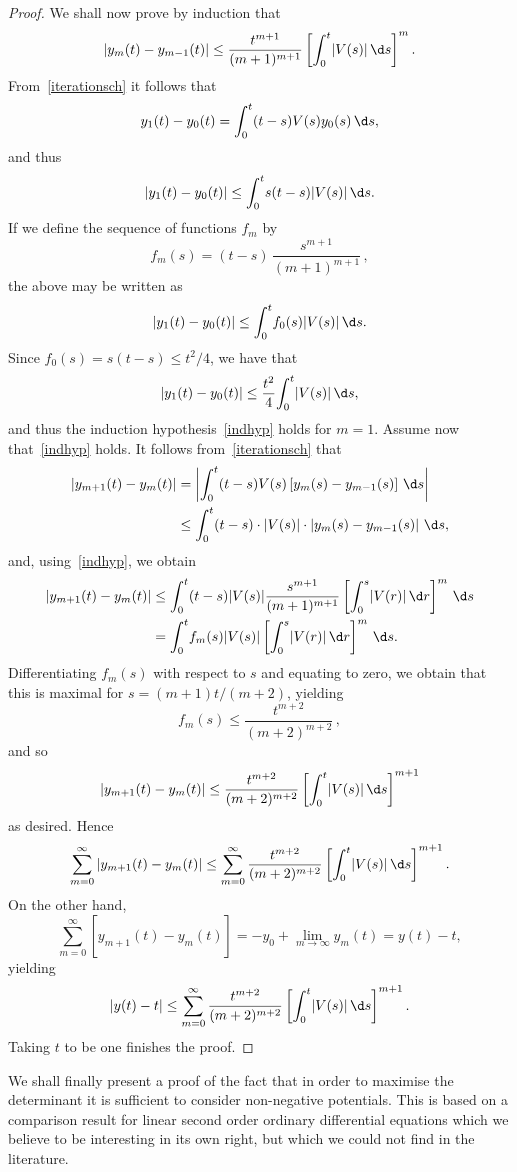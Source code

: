 \begin{proof}
We shall now prove by induction that
\begin{equation}
\label{indhyp}
|y_{m}(t)-y_{m-1}(t)|\leq \frac{ t^{m+1}}{ (m+1)^{m+1}}\left[{\int_{0}^{t}}|V(s)|\, \d s\right]^{m}.
\end{equation}
From~\eqref{iterationsch} it follows that
\[
y_{1}(t)-y_{0}(t)={\int_{0}^{t}} (t-s) V(s) y_{0}(s) \, \d s,
\]
and thus
\[
|y_{1}(t)-y_{0}(t)|\leq {\int_{0}^{t}}s (t-s) |V(s)| \, \d s.
\]
If we define the sequence of functions $f_{m}$ by
\[
f_{m}(s) = (t-s)\,\frac{ s^{m+1}}{ (m+1)^{m+1}}\,,
\]
the above may be written as
\[
|y_{1}(t)-y_{0}(t)|\leq {\int_{0}^{t}} f_{0}(s) |V(s)| \, \d s.
\]
Since $f_{0}(s) = s(t-s)\leq t^2/4$, we have that
\[
|y_{1}(t)-y_{0}(t)|\leq \frac{ t^{2}}{ 4}{\int_{0}^{t}} |V(s)| \, \d s,
\]
and thus the induction hypothesis~\eqref{indhyp} holds for $m=1$.
Assume now that~\eqref{indhyp} holds.
It follows from~\eqref{iterationsch} that
\begin{align*}
|y_{m+1}(t)-y_{m}(t)| & = \left|{\int_{0}^{t}} (t-s) V(s)\left[y_{m}(s)-y_{m-1}(s)\right]\, \d s\right|\\
& \leq {\int_{0}^{t}} (t-s)\cdot |V(s)|\cdot \left|y_{m}(s)-y_{m-1}(s)\right|\, \d s,
\end{align*}
and, using~\eqref{indhyp}, we obtain
\begin{align*}
|y_{m+1}(t)-y_{m}(t)| & \leq {\int_{0}^{t}} (t-s) |V(s)| \frac{ s^{m+1}}{ (m+1)^{m+1}}
\left[{\int_{0}^{s}}|V(r)|\, \d r\right]^{m} \, \d s\\
& = {\int_{0}^{t}} f_{m}(s)|V(s)| \left[{\int_{0}^{s}}|V(r)|\, \d r\right]^{m} \, \d s.
\end{align*}
Differentiating $f_{m}(s)$ with respect to $s$ and equating to zero, we obtain that this is maximal for $s=(m+1)t/(m+2)$, yielding
\[
f_{m}(s)\leq \frac{ t^{m+2}}{ (m+2)^{m+2}}\,,
\]
and so
\[
|y_{m+1}(t)-y_{m}(t)|\leq \frac{ t^{m+2}}{ (m+2)^{m+2}}\left[{\int_{0}^{t}}|V(s)|\, \d s\right]^{m+1}
\]
as desired. Hence
\[
\sum_{m=0}^{\infty} |y_{m+1}(t)-y_{m}(t)|\leq \sum_{m=0}^{\infty} \frac{ t^{m+2}}{ (m+2)^{m+2}}\left[{\int_{0}^{t}} |V(s)|\, \d s \right]^{m+1}.
\]
On the other hand,
\[
\sum_{m=0}^{\infty}\left[\right. y_{m+1}(t)-y_{m}(t)\left.\right]=-y_{0} + \lim_{m\to\infty} y_{m}(t) = y(t)-t,
\]
yielding
\[
|y(t)-t| \leq \sum_{m=0}^{\infty} \frac{ t^{m+2}}{ (m+2)^{m+2}} \left[{\int_{0}^{t}} |V(s)|\, \d s \right]^{m+1}.
\]
Taking $t$ to be one finishes the proof.
\end{proof}

We shall finally present a proof of the fact that in order to maximise the determinant it is sufficient to consider non-negative
potentials. This is based on a comparison result for linear second order ordinary differential equations which we believe to
be interesting in its own right, but which we could not find in the literature.

